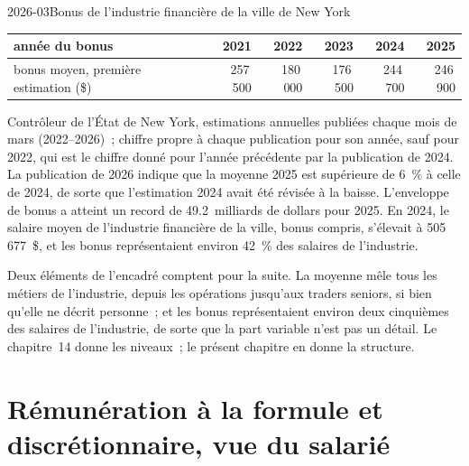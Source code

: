 \begin{dated}{2026-03}{Bonus de l'industrie financière de la ville de New York}\label{dat:in:how-pay-works:nyc}
\footnotesize
\begin{tabular}{@{}lrrrrr@{}}
\toprule
année du bonus & 2021 & 2022 & 2023 & 2024 & 2025\\
\midrule
bonus moyen, première estimation (\$) & 257\,500 & 180\,000 & 176\,500 & 244\,700 & 246\,900\\
\bottomrule
\end{tabular}

\smallskip\noindent Contrôleur de l'État de New York, estimations annuelles publiées chaque mois de mars (2022--2026)~; chiffre propre à chaque publication pour son
année, sauf pour 2022, qui est le chiffre donné pour l'année précédente par la publication de 2024. La publication de 2026
indique que la moyenne 2025 est supérieure de 6~\% à celle de 2024, de sorte que l'estimation 2024 avait été révisée à la baisse. L'enveloppe de bonus a atteint un record
de 49.2~milliards de dollars pour 2025. En 2024, le salaire moyen de l'industrie financière de la ville, bonus compris, s'élevait à 505\,677~\$, et les
bonus représentaient environ 42~\% des salaires de l'industrie.
\end{dated}

Deux éléments de l'encadré comptent pour la suite. La moyenne mêle tous les métiers de l'industrie, depuis les opérations jusqu'aux
traders seniors, si bien qu'elle ne décrit personne~; et les bonus représentaient environ deux cinquièmes des salaires de l'industrie, de sorte que la part variable n'est pas
un détail. Le chapitre~14 donne les niveaux~; le présent chapitre en donne la structure.

\section{Rémunération à la formule et discrétionnaire, vue du salarié}

